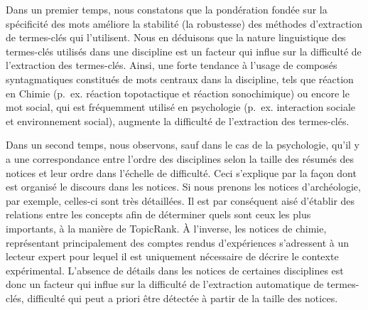   Dans un premier temps, nous constatons que la pondération fondée sur la
  spécificité des mots améliore la stabilité (la robustesse) des méthodes
  d'extraction de termes-clés qui l'utilisent. Nous en déduisons que la nature
  linguistique des termes-clés utilisés dans une discipline est un facteur qui
  influe sur la difficulté de l'extraction des termes-clés. Ainsi, une forte
  tendance à l'usage de composés syntagmatiques constitués de mots centraux dans
  la discipline, tels que \og{}réaction\fg{} en Chimie (p.~ex. \og{}réaction
  topotactique\fg{} et \og{}réaction sonochimique\fg{}) ou encore le mot
  \og{}social\fg{}, qui est fréquemment utilisé en psychologie (p.~ex.
  \og{}interaction sociale\fg{} et \og{}environnement social\fg{}), augmente la
  difficulté de l'extraction des termes-clés.

  Dans un second temps, nous observons, sauf dans le cas de la psychologie,
  qu'il y a une correspondance entre l'ordre des disciplines selon la taille des
  résumés des notices et leur ordre dans l'échelle de difficulté. Ceci
  s'explique par la façon dont est organisé le discours dans les notices. Si
  nous prenons les notices d'archéologie, par exemple, celles-ci sont très
  détaillées. Il est par conséquent aisé d'établir des relations entre les
  concepts afin de déterminer quels sont ceux les plus importants, à la manière
  de TopicRank. À l'inverse, les notices de chimie, représentant principalement
  des comptes rendus d'expériences s'adressent à un lecteur expert pour lequel
  il est uniquement nécessaire de décrire le contexte expérimental. L'absence de
  détails dans les notices de certaines disciplines est donc un facteur qui
  influe sur la difficulté de l'extraction automatique de termes-clés,
  difficulté qui peut a priori être détectée à partir de la taille des notices.

